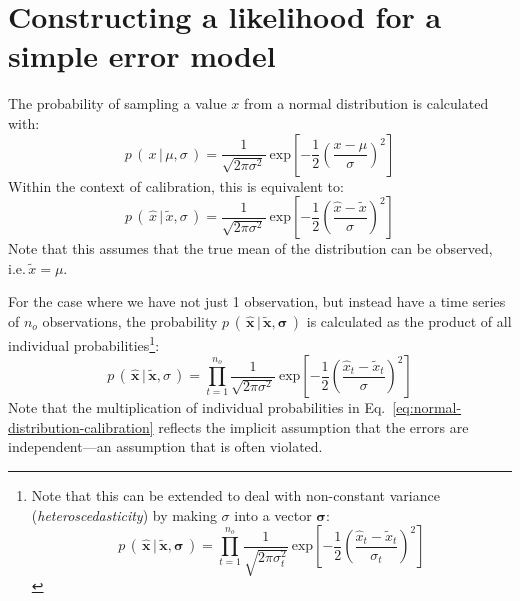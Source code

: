 






\section{Constructing a likelihood for a simple error model}
The probability of sampling a value $x$ from a normal distribution  is
calculated with:
\begin{equation}\label{eq:normal-distribution}
p\,(\,x\,|\,\mu,\sigma\,) =
\frac{1}{\sqrt{2\pi\sigma^2}}\:\mathrm{exp}\left[{-\frac{1}{2}\left(\frac{x-\mu}{\sigma}\right)^2}\right]
\end{equation}
Within the context of calibration, this is equivalent to:
\begin{equation}\label{eq:normal-distribution-calibration}
p\,(\,\hat{x}\,|\,\tilde{x},\sigma\,) =
\frac{1}{\sqrt{2\pi\sigma^2}}\:\mathrm{exp}\left[{-\frac{1}{2}\left(\frac{\hat{x}-\tilde{x}}{\sigma}\right)^2}\right]
\end{equation}
Note that this assumes that the true mean of the distribution can be observed,
i.e.\,$\tilde{x}=\mu$.

For the case where we have not just 1 observation, but instead have a time
series of $n_o$ observations, the probability
$p\,(\,\hat{\mathbf{x}}\,|\,\tilde{\mathbf{x}},\boldsymbol\sigma\,)$ is
calculated as the product of all individual probabilities\footnote{Note that
this can be extended to deal with non-constant variance
(\textit{heteroscedasticity}) by making $\sigma$ into a vector
$\boldsymbol\sigma$:
\begin{equation}\label{eq:heteroscedastic-normal-distribution-calibration}
p\,(\,\hat{\mathbf{x}}\,|\,\tilde{\mathbf{x}},\boldsymbol\sigma\,) =
\prod_{t=1}^{n_o}
\frac{1}{\sqrt{2\pi\sigma_t^2}}\:\mathrm{exp}\left[{-\frac{1}{2}\left(\frac{\hat{x}_t-\tilde{x}_t}{\sigma_t}\right)^2}\right]\nonumber
\end{equation}}:
\begin{equation}\label{eq:normal-distribution-calibration}
p\,(\,\hat{\mathbf{x}}\,|\,\tilde{\mathbf{x}},\sigma\,) = \prod_{t=1}^{n_o}
\frac{1}{\sqrt{2\pi\sigma^2}}\:\mathrm{exp}\left[{-\frac{1}{2}\left(\frac{\hat{x}_t-\tilde{x}_t}{\sigma}\right)^2}\right]
\end{equation}
Note that the multiplication of individual probabilities in
Eq.~\ref{eq:normal-distribution-calibration} reflects the implicit assumption
that the errors are independent---an assumption that is often violated.

